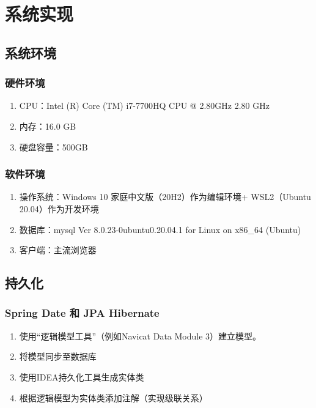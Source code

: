 
\chapter{系统实现}
\label{系统实现}

\section{系统环境}

\subsection{硬件环境}

\begin{enumerate}
  \item CPU：Intel (R) Core (TM) i7-7700HQ CPU @ 2.80GHz   2.80 GHz
  \item 内存：16.0 GB
  \item 硬盘容量：500GB
\end{enumerate}

\subsection{软件环境}

\begin{enumerate}
  \item 操作系统：Windows 10 家庭中文版（20H2）作为编辑环境+ WSL2（Ubuntu 20.04）作为开发环境
  \item 数据库：mysql Ver 8.0.23-0ubuntu0.20.04.1 for Linux on x86\_64 (Ubuntu)
  \item 客户端：主流浏览器
\end{enumerate}

\section{持久化}
\subsection{Spring Date 和 JPA Hibernate}

\begin{enumerate}
  \item 使用“逻辑模型工具”（例如Navicat Data Module 3）建立模型。
  \item 将模型同步至数据库
  \item 使用IDEA持久化工具生成实体类
  \item 根据逻辑模型为实体类添加注解（实现级联关系）
\end{enumerate}

